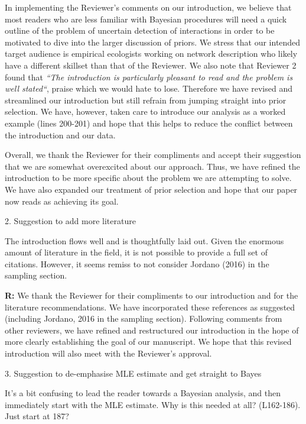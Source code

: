 \documentclass[12pt]{letter}
\newenvironment{refquote}{\bigskip \begin{it}}{\end{it}\smallskip}
\begin{document}
		In implementing the Reviewer's comments on our introduction, we believe that most readers who are less familiar with Bayesian procedures will need a quick outline of the problem of uncertain detection of interactions in order to be motivated to dive into the larger discussion of priors. We stress that our intended target audience is empirical ecologists working on network description who likely have a different skillset than that of the Reviewer. We also note that Reviewer 2 found that \emph{``The introduction is particularly pleasant to read and the problem is well stated``}, praise which we would hate to lose. Therefore we have revised and streamlined our introduction but still refrain from jumping straight into prior selection. We have, however, taken care to introduce our analysis as a worked example (lines 200-201) and hope that this helps to reduce the conflict between the introduction and our data. 


		Overall, we thank the Reviewer for their compliments and accept their suggestion that we are somewhat overexcited about our approach. Thus, we have refined the introduction to be more specific about the problem we are attempting to solve. We have also expanded our treatment of prior selection and hope that our paper now reads as achieving its goal.


	2. Suggestion to add more literature


		\begin{refquote}
		The introduction flows well and is thoughtfully laid out. Given the enormous amount of literature in the field, it is not possible to provide a full set of citations. However, it seems remiss to not consider Jordano (2016) in the sampling section.
		\end{refquote}


		\textbf{R:} We thank the Reviewer for their compliments to our introduction and for the literature recommendations. We have incorporated these references as suggested (including Jordano, 2016 in the sampling section). Following comments from other reviewers, we have refined and restructured our introduction in the hope of more clearly establishing the goal of our manuscript. We hope that this revised introduction will also meet with the Reviewer's approval. 


	3. Suggestion to de-emphasise MLE estimate and get straight to Bayes


		\begin{refquote}
		It's a bit confusing to lead the reader towards a Bayesian analysis, and then immediately start with the MLE estimate. Why is this needed at all? (L162-186). Just start at 187?
		\end{refquote}
\end{document}
